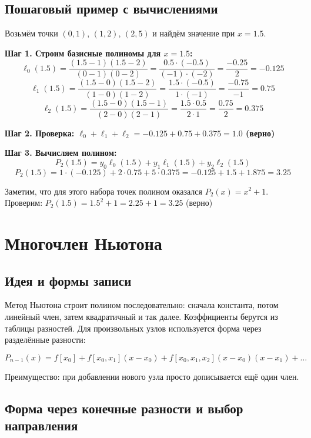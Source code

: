 \documentclass[12pt,a4paper]{article}
\begin{document}
\subsection{Пошаговый пример с вычислениями}
Возьмём точки $(0,1)$, $(1,2)$, $(2,5)$ и найдём значение при $x=1.5$.

\begin{exbox}
\textbf{Шаг 1. Строим базисные полиномы для $x = 1.5$:}
\[
\ell_0(1.5)=\frac{(1.5-1)(1.5-2)}{(0-1)(0-2)}=\frac{0.5 \cdot (-0.5)}{(-1) \cdot (-2)}=\frac{-0.25}{2}=-0.125
\]
\[
\ell_1(1.5)=\frac{(1.5-0)(1.5-2)}{(1-0)(1-2)}=\frac{1.5 \cdot (-0.5)}{1 \cdot (-1)}=\frac{-0.75}{-1}=0.75
\]
\[
\ell_2(1.5)=\frac{(1.5-0)(1.5-1)}{(2-0)(2-1)}=\frac{1.5 \cdot 0.5}{2 \cdot 1}=\frac{0.75}{2}=0.375
\]

\textbf{Шаг 2. Проверка: $\ell_0 + \ell_1 + \ell_2 = -0.125 + 0.75 + 0.375 = 1.0$ (верно)}

\textbf{Шаг 3. Вычисляем полином:}
\[
P_2(1.5)=y_0 \ell_0(1.5)+y_1 \ell_1(1.5)+y_2 \ell_2(1.5)
\]
\[
P_2(1.5)=1 \cdot (-0.125)+2 \cdot 0.75+5 \cdot 0.375=-0.125+1.5+1.875=3.25
\]

Заметим, что для этого набора точек полином оказался $P_2(x)=x^2+1$. Проверим: $P_2(1.5)=1.5^2+1=2.25+1=3.25$ (верно)
\end{exbox}

\section{Многочлен Ньютона}
\subsection{Идея и формы записи}

Метод Ньютона строит полином последовательно: сначала константа, потом линейный член, затем квадратичный и так далее. Коэффициенты берутся из таблицы разностей. Для произвольных узлов используется форма через разделённые разности:

\begin{formbox}
\[
P_{n-1}(x)=f[x_0]+f[x_0,x_1](x-x_0)+f[x_0,x_1,x_2](x-x_0)(x-x_1)+\dots
\]
\end{formbox}

Преимущество: при добавлении нового узла просто дописывается ещё один член.

\subsection{Форма через конечные разности и выбор направления}
\end{document}
